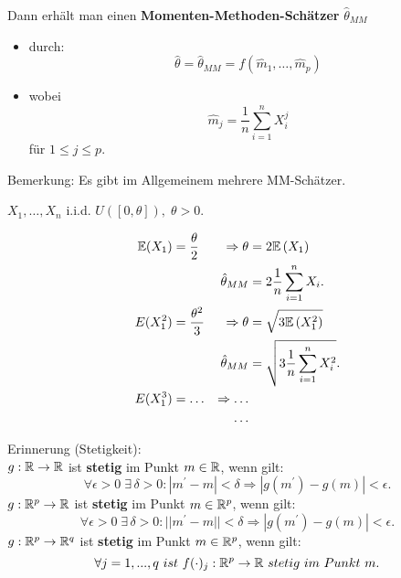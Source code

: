 \documentclass{tstextbook}
\begin{document}
Dann erhält man einen \textbf{Momenten-Methoden-Schätzer}  $ {\hat{\theta}}_{MM} $ 
	\begin{itemize}
		\item durch: \[ \hat{\theta} = {\hat{\theta}}_{MM} = f\left(\hat{m}_1,\ldots,\hat{m}_p \right) \] 
		\item wobei  \[ \hat{m}_j = \frac{1}{n} \sum_{i=1}^{n} X_i^j \] für $ 1 \leq j \leq p  $.
	\end{itemize}

\begin{remark}
	Bemerkung: Es gibt im Allgemeinem mehrere MM-Schätzer.
\end{remark}

\begin{example}[Gleichverteilung]
	$ X_1, \ldots, X_n $ i.i.d. $ U([0,\theta]), \; \theta > 0 $.
	
	\[
	\begin{aligned}
		\mathbb E(X_1) &= \frac{\theta}{2} & \Rightarrow \theta & = 2\mathbb E\left(X_1\right) \\
		& & {\hat{\theta}}_{MM} & = 2 \frac{1}{n} \sum_{i=1}^{n} X_i. \\
		E(X_1^2) &= \frac{\theta^2}{3} & \Rightarrow \theta & = \sqrt{3\mathbb E\left(X_1^2\right)} \\
		& & {\hat{\theta}}_{MM} & = \sqrt{3\frac{1}{n} \sum_{i=1}^{n} X_i^2}. \\
		E(X_1^3) &= \ldots & \Rightarrow \ldots \\
		& & \ldots
	\end{aligned}
	\]
	
\end{example}


\begin{remark}
	Erinnerung (Stetigkeit):\\
	$ g: \mathbb R \rightarrow \mathbb R $ ist \textbf{stetig} im Punkt $ m \in \mathbb R $, wenn gilt: 
	\[ \forall \epsilon > 0 \; \exists \, \delta >0 \colon |m^\prime - m| < \delta \Rightarrow |g(m^\prime) - g(m)| < \epsilon. \]
	$ g: \mathbb R^p \rightarrow \mathbb R $ ist \textbf{stetig} im Punkt $ m \in \mathbb R^p $, wenn gilt: 
	\[ \forall \epsilon > 0 \; \exists \, \delta >0 \colon ||m^\prime - m|| < \delta \Rightarrow |g(m^\prime) - g(m)| < \epsilon. \]
	$ g: \mathbb R^p \rightarrow \mathbb R^q $ ist \textbf{stetig} im Punkt $ m \in \mathbb R^p $, wenn gilt: 
	\[ \forall j={1,...,q} \ ist \ f(\cdot)_j: \R^p \rightarrow \R \ stetig \ im \ Punkt \ m. \]
	\\
	\\
	\\
\end{remark}
\end{document}
